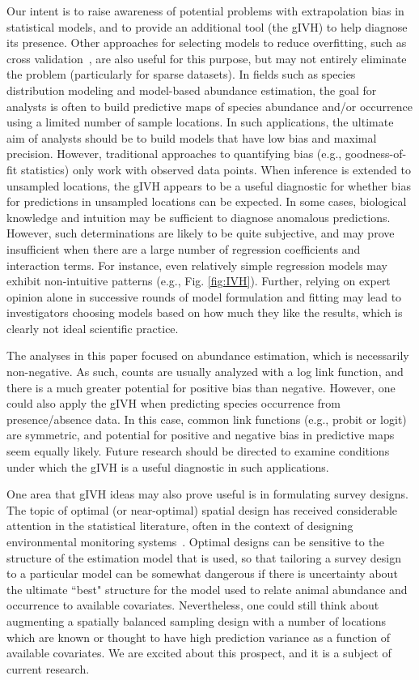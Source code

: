 \documentclass[10pt,letterpaper]{article}
\begin{document}
Our intent is to raise awareness of potential problems with extrapolation bias in statistical models, and to provide an additional tool (the gIVH) to help diagnose its presence.  Other approaches for selecting models to reduce overfitting, such as cross validation~\cite{PicardCook1984}, are also useful for this purpose, but may not entirely eliminate the problem (particularly for sparse datasets). In fields such as species distribution modeling and model-based abundance estimation, the goal for analysts is often to build predictive maps of species abundance and/or occurrence using a limited number of sample locations.
In such applications, the ultimate aim of analysts should be to build models that have low bias and maximal precision.  However, traditional approaches to quantifying bias (e.g., goodness-of-fit statistics) only work with observed data points.  When inference is extended to unsampled locations, the gIVH appears to be a useful diagnostic for whether bias for predictions in unsampled locations can be expected.  In some cases, biological knowledge and intuition may be sufficient to diagnose anomalous predictions.  However, such determinations are likely to be quite subjective, and may prove insufficient when there are a large number of regression coefficients and interaction terms.  For instance, even relatively simple regression models may exhibit non-intuitive patterns (e.g., Fig. \ref{fig:IVH}).  Further, relying on expert opinion alone in successive rounds of model formulation and fitting may lead to investigators choosing models based on how much they like the results, which is clearly not ideal scientific practice.

The analyses in this paper focused on abundance estimation, which is necessarily non-negative.  As such, counts are usually analyzed with a log link function, and there is a much greater potential for positive bias than negative.  However, one could also apply the gIVH when predicting species occurrence from presence/absence data.  In this case, common link functions (e.g., probit or logit) are symmetric, and potential for positive and negative bias in predictive maps seem equally likely.  Future research should be directed to examine conditions under which the gIVH is a useful diagnostic in such applications.

One area that gIVH ideas may also prove useful is in formulating survey designs.  The topic of optimal (or near-optimal) spatial design has received considerable attention in the statistical literature, often in the context of designing environmental monitoring systems~\cite{Muller2007}.  Optimal designs can be sensitive to the structure of the estimation model that is used, so that tailoring a survey design to a particular model can be somewhat dangerous if there is uncertainty about the ultimate ``best" structure for the model used to relate animal abundance and occurrence to available covariates.  Nevertheless, one could still think about augmenting a spatially balanced sampling design with a number of locations which are known or thought to have high prediction variance as a function of available covariates.  We are excited about this prospect, and it is a subject of current research.
\end{document}
